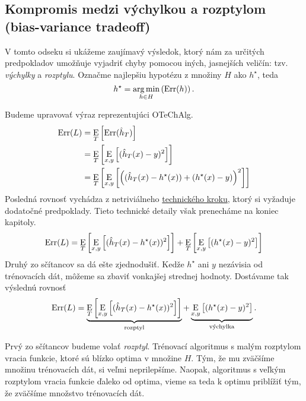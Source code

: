 \newcommand{\vVychylka}{\text{výchylka}}
\newcommand{\vRozptyl}{\text{rozptyl}}
\newcommand{\vRozptylT}{\text{trénovací rozptyl}}
\newcommand{\vOTrChAlg}{\text{očakávaná trénovacia chyba algoritmu}}



\subsection{Kompromis medzi výchylkou a rozptylom (bias-variance tradeoff)} \label{biasvarianceodvodenie}

V tomto odseku si ukážeme zaujímavý výsledok, ktorý nám za určitých
predpokladov umožňuje vyjadriť chyby pomocou iných, jasnejších veličín:
tzv. \emph{výchylky} a \emph{rozptylu}.
Označme najlepšiu hypotézu z množiny $H$ ako $h^\star$, teda
$$h^\star = \operatorname*{{arg\,min}}_{h \in H} \left( \mathrm{Err}(h) \right).$$

Budeme upravovať výraz reprezentujúci OTeChAlg.
\begin{align}
  \mathrm{Err}(L)
    &= \operatorname*{\mathrm{E}}_T \left[ \mathrm{Err}(\hat{h}_T) \right] \\
    &= \operatorname*{\mathrm{E}}_T \left[ \operatorname*{\mathrm{E}}_{x,y} \left[ (\hat{h}_T(x) - y)^2 \right] \right] \\
    &= \operatorname*{\mathrm{E}}_T \left[ \operatorname*{\mathrm{E}}_{x,y} \left[ \left( (\hat{h}_T(x) - h^\star(x)) + (h^\star(x) - y) \right)^2 \right] \right]
\end{align}
Posledná rovnosť vychádza z netriviálneho \hyperref[tradeoff:tech]{technického kroku},
ktorý si vyžaduje dodatočné predpoklady. Tieto technické detaily však prenecháme
na koniec kapitoly.
$$
  \mathrm{Err}(L)
    = \operatorname*{\mathrm{E}}_T \left[ \operatorname*{\mathrm{E}}_{x,y} \left[ (\hat{h}_T(x) - h^\star(x))^2 \right] \right]
    + \operatorname*{\mathrm{E}}_T \left[ \operatorname*{\mathrm{E}}_{x,y} \left[ (h^\star(x) - y)^2 \right] \right]
$$
Druhý zo sčítancov sa dá ešte zjednodušiť. Kedže $h^\star$ ani $y$
nezávisia od trénovacích dát, môžeme sa zbaviť vonkajšej strednej
hodnoty. Dostávame tak výslednú rovnosť
$$
  \Err(L)
    = \underbrace{\E_T \left[ \E_{x,y} \left[ (\hat{h}_T(x) - h^\star(x))^2 \right] \right]}_{\vRozptyl}
    + \underbrace{\E_{x,y} \left[ (h^\star(x) - y)^2 \right]}_{\vVychylka}.
$$

Prvý zo sčítancov budeme volať \emph{rozptyl}. Trénovací algoritmus
s malým rozptylom vracia funkcie, ktoré sú blízko optima v množine $H$.
Tým, že mu zväčšíme množinu trénovacích dát, si veľmi neprilepšíme.
Naopak, algoritmus s veľkým rozptylom vracia funkcie ďaleko od optima,
vieme sa teda k optimu priblížiť tým, že zväčšíme množstvo trénovacích
dát.

\medskip

